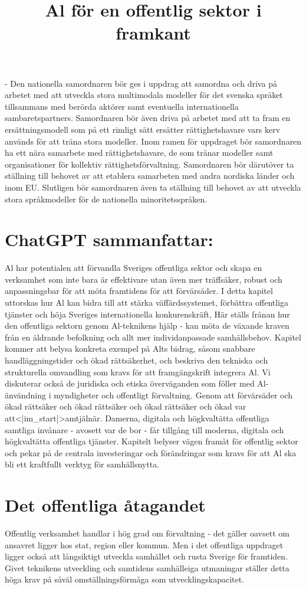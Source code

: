 {{{{{{{{{{{{{{- Den nationella samordnaren bör ges i uppdrag att samordna och driva på arbetet med att utveckla stora multimodala modeller för det svenska språket tillsammans med berörda aktörer samt eventuella internationella sambaretspartners. Samordnaren bör även driva på arbetet med att ta fram en ersättningsmodell som på ett rimligt sätt ersätter rättighetshavare vars kerv används för att träna stora modeller. Inom ramen för uppdraget bör samordnaren ha ett nära samarbete med rättighetshavare, de som tränar modeller samt organisationer för kollektiv rättighetsförvaltning. Samordnaren bör därutöver ta ställning till behovet av att etablera samarbeten med andra nordiska länder och inom EU. Slutligen bör samordnaren även ta ställning till behovet av att utveckla stora språkmodeller för de nationella minoritetsspråken.

\title{
Al för en offentlig sektor i framkant
}
\section*{ChatGPT sammanfattar:}
Al har potentialen att förvandla Sveriges offentliga sektor och skapa en verksamhet som inte bara är effektivare utan även mer träffsäker, robust och anpassningsbar för att möta framtidens för att förvärsäder.
I detta kapitel uttorskas hur Al kan bidra till att stärka väffärdssystemet, förbättra offentliga tjänster och höja Sveriges internationella konkurenskräft, Här ställs frånan hur den offentliga sektorn genom Al-teknikens hjälp - kan möta de växande kraven från en åldrande befolkning och allt mer individanpassade samhällsbehov. Kapitel kommer att belysa konkreta exempel på Alts bidrag, såsom snabbare handläggningstider och ökad rättsäkerhet, och beskriva den tekniska och strukturella omvandling som kravs för att framgängskrift integrera Al. Vi diskuterar också de juridiska och etiska överväganden som föller med Al-änvändning i myndigheter och offentligt förvaltning. Genom att förvärsäder och ökad rättsäker och ökad rättsäker och ökad rättsäker och ökad var att<|im_start|>amtjälnär. Damerna, digitala och högkvaltätta offentliga samtliga invånare - avosett var de bor - får tillgång till moderna, digitala och högkvaltätta offentliga tjänster. Kapitelt belyser vägen framåt för offentlig sektor och pekar på de centrala investeringar och förändringar som kravs för att Al ska bli ett kraftfullt verktyg för samhällsnytta.
\section*{Det offentliga åtagandet}
Offentlig verksamhet handlar i hög grad om förvaltning - det gäller oavsett om ansavret ligger hos stat, region eller kommun. Men i det offentliga uppdraget ligger också att långsiktigt utveckla samhället och rusta Sverige för framtiden. Givet teknikens utveckling och samtidens samhälleiga utmaningar ställer detta höga krav på såväl omställningsförmåga som utvecklingskapacitet.
}}}}}}}}}}}}}}
